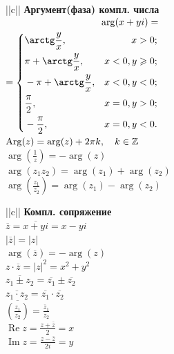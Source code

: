 \begin{tabu}[t]{||c||}
	\hline
		\textbf{Аргумент(фаза) компл. числа} \\
	\hline
	\hline
		$\displaystyle
		\begin{aligned}
		\arg(x+yi) = \\
		= \left\{
		\begin{aligned}
			& \arctg\frac{y}{x}, & x > 0; \\
			& \pi + \arctg\frac{y}{x}, & x < 0, y \geqslant 0; \\
			& -\pi + \arctg\frac{y}{x}, & x < 0, y < 0; \\
			& \frac{\pi}{2}, & x = 0, y > 0; \\
			& -\frac{\pi}{2}, & x = 0, y < 0. \\
		\end{aligned}
		\right. \\
		\end{aligned} $ \\
	\hline
		$\displaystyle \operatorname{Arg}(z) = \arg(z) + 2\pi k, \quad k \in \mathbb{Z} $ \\
	\hline
		$\displaystyle \arg\left(\frac{1}{z}\right) = -\arg(z) $ \\
	\hline
		$\displaystyle \arg(z_1 z_2) = \arg(z_1) + \arg(z_2) $ \\
	\hline
		$\displaystyle \arg\left(\frac{z_1}{z_2}\right) = \arg(z_1) - \arg(z_2) $ \\
	\hline
\end{tabu}
\begin{tabu}[t]{||c||}
	\hline
		\textbf{Компл. сопряжение} \\
	\hline
	\hline
		$\displaystyle \overline{z} = \overline{x + yi} = x - yi $ \\
	\hline
		$\displaystyle |\overline{z}| = |z| $ \\
	\hline
		$\displaystyle \arg(\overline z) = -\arg(z) $ \\
	\hline
		$\displaystyle z\cdot\overline{z} = |z|^2 = x^2 + y^2 $ \\
	\hline
		$\displaystyle \overline{z_1 \pm z_2} = \overline{z_1} \pm \overline{z_2} $ \\
	\hline
		$\displaystyle \overline{z_1\cdot z_2} = \overline{z_1}\cdot\overline{z_2} $ \\
	\hline
		$\displaystyle \overline{\left(\frac{z_1}{z_2}\right)} = \frac{\overline z_1}{\overline z_2} $ \\
	\hline
		$\displaystyle \mathop{\text{Re}} z = \frac{z + \overline{z}}{2} = x $ \\
	\hline
		$\displaystyle \mathop{\text{Im}} z = \frac{z - \overline{z}}{2i} = y $ \\
	\hline
\end{tabu}
